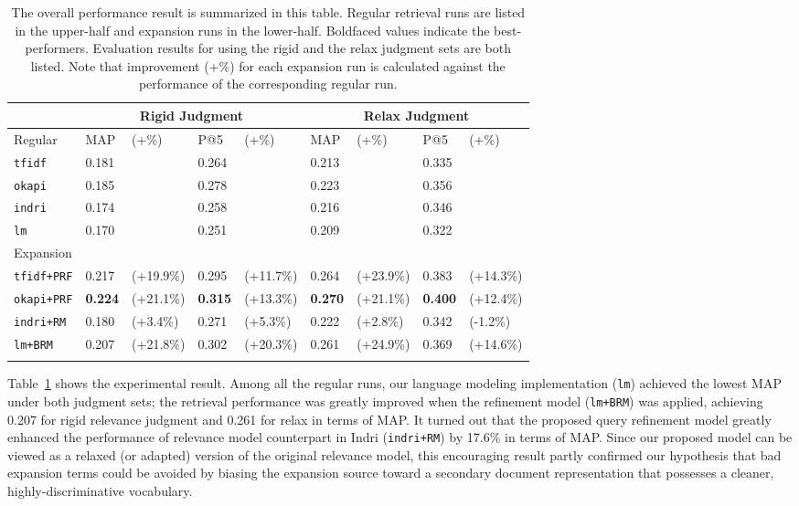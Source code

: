 \begin{table}[ht!]
  \centering
  \begin{tabular}{p{2.4cm}llllllll}
    & \multicolumn{4}{c}{Rigid Judgment} & \multicolumn{4}{c}{Relax Judgment} \\
    \hline
    Regular & MAP & (+\%) & P@5 & (+\%) & MAP & (+\%) & P@5 & (+\%) \\
    \hline
    {\tt tfidf} & 0.181 & & 0.264 & & 0.213 & & 0.335 & \\
    {\tt okapi} & 0.185 & & 0.278 & & 0.223 & & 0.356 & \\
    {\tt indri} & 0.174 & & 0.258 & & 0.216 & & 0.346 & \\
    {\tt lm}    & 0.170 & & 0.251 & & 0.209 & & 0.322 & \\
    \hline
    Expansion & & & & & & & & \\
    \hline
    {\tt tfidf+PRF} & 0.217 & (+19.9\%) & 0.295 & (+11.7\%) & 0.264 & (+23.9\%) & 0.383 & (+14.3\%) \\
    {\tt okapi+PRF} & {\bf 0.224} & (+21.1\%) & {\bf 0.315} & (+13.3\%) & {\bf 0.270} & (+21.1\%) & {\bf 0.400} & (+12.4\%) \\
    {\tt indri+RM} & 0.180 & (+3.4\%) & 0.271 & (+5.3\%) & 0.222 & (+2.8\%) & 0.342 & (-1.2\%) \\
    {\tt lm+BRM} & 0.207 & (+21.8\%) & 0.302 & (+20.3\%) & 0.261 & (+24.9\%) & 0.369 & (+14.6\%) \\
    \\
  \end{tabular}
  \caption{The overall performance result is summarized in this table.  Regular
  retrieval runs are listed in the upper-half and expansion runs in the
  lower-half.  Boldfaced values indicate the best-performers.  Evaluation
  results for using the rigid and the relax judgment sets are both listed.  Note
  that improvement (+\%) for each expansion run is calculated against the
  performance of the corresponding regular run.} \label{t:retrieval}
\end{table}

Table~\ref{t:retrieval} shows the experimental result.  Among all the regular
runs, our language modeling implementation ({\tt lm}) achieved the lowest MAP
under both judgment sets; the retrieval performance was greatly improved when
the refinement model ({\tt lm+BRM}) was applied, achieving 0.207 for rigid
relevance judgment and 0.261 for relax in terms of MAP.  It turned out that the
proposed query refinement model greatly enhanced the performance of relevance
model counterpart in Indri ({\tt indri+RM}) by 17.6\% in terms of MAP.  Since
our proposed model can be viewed as a relaxed (or adapted) version of the
original relevance model, this encouraging result partly confirmed our
hypothesis that bad expansion terms could be avoided by biasing the expansion
source toward a secondary document representation that possesses a cleaner,
highly-discriminative vocabulary.  

